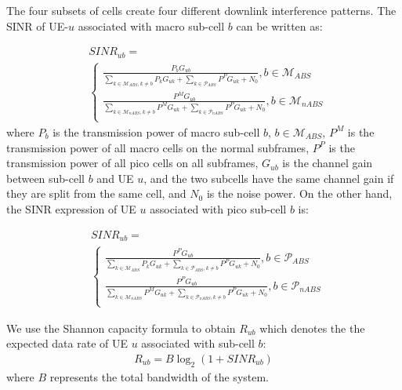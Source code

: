 \documentclass[journal]{IEEETran}
\begin{document}
 The four subsets of cells create four different downlink interference patterns. The SINR of UE-$u$ associated with macro sub-cell $b$ can be written as:

\begin{align}\label{SINR1}
&{SINR}_{ub}=\nonumber \\
&\left\{
\begin{matrix}
{\frac{P_bG_{ub}}{{\sum\nolimits_{k \in \mathcal{M}_{ABS},k \ne b} {{P_k}{G_{uk}} + \sum\nolimits_{k \in \mathcal{P}_{ABS}} {{P^{P}}{G_{uk}} + {N_0}} } }},b\in \mathcal{M}_{ABS}}\\
{\frac{P^{M}G_{ub}}{{\sum\nolimits_{k \in {\mathcal{M}_{nABS}},k \ne b} {{P^{M}}{G_{uk}} + \sum\nolimits_{k \in {\mathcal{P}_{nABS}}} {{P^{P}}{G_{uk}} + {N_0}} } }},b\in \mathcal {M}_{nABS}}\\
\end{matrix}
\right.
\end{align}
where $P_b$ is the transmission power of macro sub-cell $b$, $b \in \mathcal{M}_{ABS}$, $P^M$ is the transmission power of all macro cells on the normal subframes, $P^P$  is the transmission power of all pico cells on all subframes, $G_{ub}$ is the channel gain between sub-cell $b$ and UE $u$, and the two subcells have the same channel gain if they are split from the same cell, and $N_0$ is the noise power. On the other hand, the SINR expression of UE $u$ associated with pico sub-cell $b$ is:

\begin{align}\label{SINR2}
&{SINR}_{ub}=\nonumber \\
&\left\{
\begin{matrix}
{\frac{P^{P}G_{ub}}{{\sum\nolimits_{k \in \mathcal{M}_{ABS}}{{P_k}{G_{uk}} + \sum\nolimits_{k \in \mathcal{P}_{ABS},k \ne b} {{P^{P}}{G_{uk}} + {N_0}} } }},b\in \mathcal{P}_{ABS}}\\
{\frac{P^{P}G_{ub}}{{\sum\nolimits_{k \in {\mathcal{M}_{nABS}}}{{P^{M}}{G_{uk}} + \sum\nolimits_{k \in {\mathcal{P}_{nABS}},k \ne b} {{P^{P}}{G_{uk}} + {N_0}} } }},b\in \mathcal {P}_{nABS}}\\
\end{matrix}
\right.
\end{align}

We use the Shannon capacity formula to obtain $R_{ub}$ which denotes the the expected data rate of UE $u$ associated with sub-cell $b$:
\begin{align}\label{Rate}
R_{ub} = B\log_2(1+SINR_{ub})
\end{align}
where $B$ represents the total bandwidth of the system. 
\end{document}
